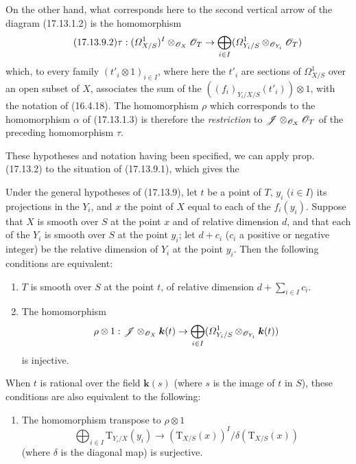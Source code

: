 \begin{env}[17.13.9]
On the other hand, what corresponds here to the second vertical arrow of the diagram (17.13.1.2) is the homomorphism
\[
\label{IV.17.13.9.2}
\tag{17.13.9.2}
\tau:(\varOmega^1_{X/S})^I\otimes_{\mathscr{O}_X}\mathscr{O}_T\to\bigoplus_{i\in I}(\varOmega^1_{Y_i/S}\otimes_{\mathscr{O}_{Y_i}}\mathscr{O}_T)
\]
which, to every family $(t'_i\otimes1)_{i\in I}$, where here the $t'_i$ are sections of $\varOmega^1_{X/S}$ over an open subset of $X$, associates the sum of the $((f_i)_{Y_i/X/S}(t'_i))\otimes1$, with the notation of (16.4.18). The homomorphism $\rho$ which corresponds to the homomorphism $\alpha$ of (17.13.1.3) is therefore the \emph{restriction} to $\mathscr{J}\otimes_{\mathscr{O}_X}\mathscr{O}_T$ of the preceding homomorphism $\tau$.

These hypotheses and notation having been specified, we can apply prop. (17.13.2) to the situation of (17.13.9.1), which gives the
\end{env}

\begin{corollary}[17.13.10]\label{IV.17.13.10}
Under the general hypotheses of \textup{(17.13.9)}, let $t$ be a point of $T$, $y_i$ \textup{($i\in I$)} its projections in the $Y_i$, and $x$ the point of $X$ equal to each of the $f_i(y_i)$. Suppose that $X$ is smooth over $S$ at the point $x$ and of relative dimension $d$, and that each of the $Y_i$ is smooth over $S$ at the point $y_i$; let $d+c_i$ \textup{(}$c_i$ a positive or negative integer\textup{)} be the relative dimension of $Y_i$ at the point $y_i$. Then the following conditions are equivalent:


\begin{enumerate}
  \item[\textup{a)}] $T$ is smooth over $S$ at the point $t$, of relative dimension $d+\sum_{i\in I}c_i$.
  \item[\textup{b)}] The homomorphism
  \[
  \rho\otimes1:\mathscr{J}\otimes_{\mathscr{O}_X}\boldsymbol{k}(t)\to\bigoplus_{i\in I}(\varOmega^1_{Y_i/S}\otimes_{\mathscr{O}_{Y_i}}\boldsymbol{k}(t))
  \]
  is injective.
\end{enumerate}
When $t$ is rational over the field $\boldsymbol{k}(s)$ \textup{(}where $s$ is the image of $t$ in $S$\textup{)}, these conditions are also equivalent to the following:
\begin{enumerate}
  \item[\textup{b$'$)}] The homomorphism transpose to $\rho\otimes1$
  \[
  \bigoplus_{i\in I}\mathrm{T}_{Y_i/X}(y_i)\to(\mathrm{T}_{X/S}(x))^I/\delta(\mathrm{T}_{X/S}(x))
  \]
  (where $\delta$ is the diagonal map) is surjective.
\end{enumerate}
\end{corollary}

